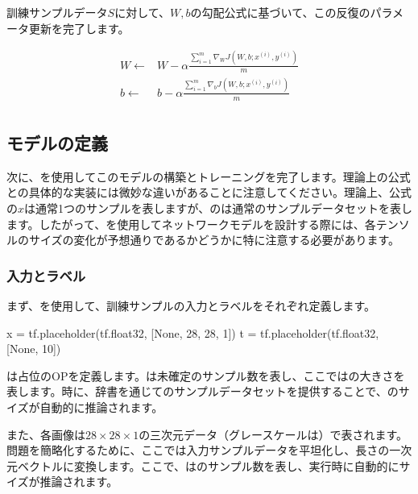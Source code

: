 \begin{content}
訓練サンプルデータ$ S $に対して、$W, b$の勾配公式に基づいて、この反復のパラメータ更新を完了します。

\[\begin{aligned}
  W \leftarrow  & W - \alpha \frac{{\sum\limits_{i = 1}^m {{\nabla _W}J\left( {W,b;{x^{(i)}},{y^{(i)}}} \right)} }}{m} \\ 
  b \leftarrow  & b - \alpha \frac{{\sum\limits_{i = 1}^m {{\nabla _b}J\left( {W,b;{x^{(i)}},{y^{(i)}}} \right)} }}{m} \\ 
\end{aligned} \]

\subsection{モデルの定義}

次に、\tf{}を使用してこのモデルの構築とトレーニングを完了します。理論上の公式と\tf{}の具体的な実装には微妙な違いがあることに注意してください。理論上、公式の$x$は通常1つのサンプルを表しますが、\tf{}のは通常のサンプルデータセットを表します。したがって、\tf{}を使用してネットワークモデルを設計する際には、各テンソルのサイズの変化が予想通りであるかどうかに特に注意する必要があります。

\subsubsection{入力とラベル}

まず、を使用して、訓練サンプルの入力とラベルをそれぞれ定義します。

\begin{leftbar}
\begin{python}
x = tf.placeholder(tf.float32, [None, 28, 28, 1])
t = tf.placeholder(tf.float32, [None, 10])
\end{python}
\end{leftbar}

は占位のOPを定義します。は未確定のサンプル数を表し、ここではの大きさを表します。時に、辞書を通じてのサンプルデータセットを提供することで、のサイズが自動的に推論されます。

また、各画像は$ 28 \times 28 \times 1 $の三次元データ（グレースケールは）で表されます。問題を簡略化するために、ここでは入力サンプルデータを平坦化し、長さの一次元ベクトルに変換します。ここで、はのサンプル数を表し、実行時に自動的にサイズが推論されます。


\end{content}
